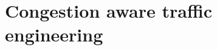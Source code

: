 \chapter{Congestion aware traffic engineering}
\label{chapter:cate}

\renewcommand{\locfolder}{\chapfolder/cate}



